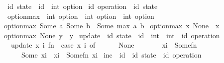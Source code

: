 \begin{isabellebody}%
\isamarkupfalse%
\ {\isacharparenleft}{\isacharprime}id{\isacharparenright}\ state\ {\isacharequal}\ {\isachardoublequoteopen}{\isacharprime}id\ {\isasymRightarrow}\ int\ option{\isachardoublequoteclose}\isanewline
{}\isamarkupfalse%
\ {\isacharparenleft}{\isacharprime}id{\isacharparenright}\ operation\ {\isacharequal}\ {\isachardoublequoteopen}{\isacharprime}id\ state{\isachardoublequoteclose}\isanewline
\isanewline
{}\isamarkupfalse%
\ option{\isacharunderscore}max\ {\isacharcolon}{\isacharcolon}\ {\isachardoublequoteopen}int\ option\ {\isasymRightarrow}\ int\ option\ {\isasymRightarrow}\ int\ option{\isachardoublequoteclose}\ \ \isanewline
{\isachardoublequoteopen}option{\isacharunderscore}max\ {\isacharparenleft}Some\ a{\isacharparenright}\ {\isacharparenleft}Some\ b{\isacharparenright}\ {\isacharequal}\ Some\ {\isacharparenleft}max\ a\ b{\isacharparenright}{\isachardoublequoteclose}\ {\isacharbar}\isanewline
{\isachardoublequoteopen}option{\isacharunderscore}max\ x\ None\ {\isacharequal}\ x{\isachardoublequoteclose}\ {\isacharbar}\isanewline
{\isachardoublequoteopen}option{\isacharunderscore}max\ None\ y\ {\isacharequal}\ y{\isachardoublequoteclose}\isanewline
\isanewline
{}\isamarkupfalse%
\ update\ {\isacharcolon}{\isacharcolon}\ {\isachardoublequoteopen}{\isacharprime}id\ state\ {\isasymRightarrow}\ {\isacharprime}id\ {\isasymRightarrow}\ {\isacharparenleft}int\ {\isasymRightarrow}\ int{\isacharparenright}\ {\isasymRightarrow}\ {\isacharparenleft}{\isacharprime}id\ operation{\isacharparenright}{\isachardoublequoteclose}\ \isanewline
\ \ {\isachardoublequoteopen}update\ x\ i\ fn\ {\isacharequal}\ {\isacharparenleft}case\ {\isacharparenleft}x\ i{\isacharparenright}\ of\isanewline
\ \ \ \ \ \ None\ \ \ \ \ \ \ {\isasymRightarrow}\ x{\isacharparenleft}i\ {\isacharcolon}{\isacharequal}\ Some{\isacharparenleft}fn\ {}{\isacharparenright}{\isacharparenright}\isanewline
\ \ \ \ {\isacharbar}\ Some\ {\isacharparenleft}x{\isacharunderscore}i{\isacharparenright}\ {\isasymRightarrow}\ x{\isacharparenleft}i\ {\isacharcolon}{\isacharequal}\ Some{\isacharparenleft}fn\ x{\isacharunderscore}i{\isacharparenright}{\isacharparenright}{\isacharparenright}{\isachardoublequoteclose}\isanewline
\isanewline
{}\isamarkupfalse%
\ inc\ {\isacharcolon}{\isacharcolon}\ {\isachardoublequoteopen}{\isacharprime}id\ {\isasymRightarrow}\ {\isacharparenleft}{\isacharprime}id\ state{\isacharparenright}\ {\isasymRightarrow}\ {\isacharparenleft}{\isacharprime}id\ operation{\isacharparenright}{\isachardoublequoteclose}\ \ \isanewline

\end{isabellebody}
